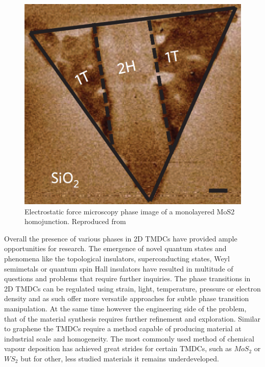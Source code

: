 \begin{figure}[!h]
	\begin{center}
		\includegraphics[scale=0.25]{1T'/Homojunction.png}
		\caption{Electrostatic force microscopy phase image of a monolayered MoS2 homojunction. Reproduced from \cite{Kappera2014}}
		\label{fig:1T'Homojunction}
	\end{center}
\end{figure}

Overall the presence of various phases in 2D TMDCs have provided ample opportunities for research. The emergence of novel quantum states and phenomena like the topological insulators, superconducting states, Weyl semimetals or quantum spin Hall insulators have resulted in multitude of questions and problems that require further inquiries. The phase transitions in 2D TMDCs can be regulated using strain, light, temperature, pressure or electron density and as such offer more versatile approaches for subtle phase transition manipulation. At the same time however the engineering side of the problem, that of the material synthesis requires further refinement and exploration. Similar to graphene the TMDCs require a method capable of producing material at industrial scale and homogeneity. The most commonly used method of chemical vapour deposition has achieved great strides for certain TMDCs, such as $MoS_2$ or $WS_2$ but for other, less studied materials it remains underdeveloped.